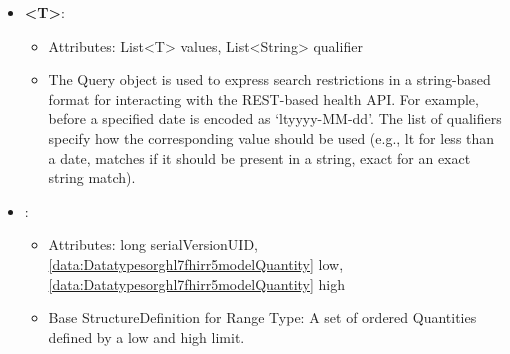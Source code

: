 \begin{itemize}[nolistsep,noitemsep]
\item {}\textbf{\textless{}T\textgreater{}}: 
\begin{itemize}[noitemsep,nolistsep]
\item[] Attributes: List\textless{}T\textgreater{} values, List\textless{}String\textgreater{} qualifier
\item[] The Query object is used to express search restrictions in a string-based format for interacting with the REST-based health API.
For example, before a specified date is encoded as `ltyyyy-MM-dd'.
The list of qualifiers specify how the corresponding value should be used (e.g., lt for less than a date, matches if it should be present in a string, exact for an exact string match).
\end{itemize}

\item {}: 
\begin{itemize}[noitemsep,nolistsep]
\item[] Attributes: long serialVersionUID, \ref{data:Datatypesorghl7fhirr5modelQuantity} low, \ref{data:Datatypesorghl7fhirr5modelQuantity} high
\item[] Base StructureDefinition for Range Type: A set of ordered Quantities defined by a low and high limit.
\end{itemize}


\end{itemize}
